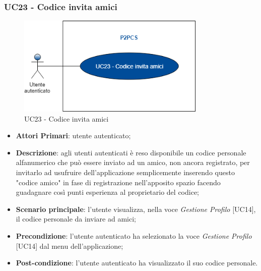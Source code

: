 \subsubsection{UC23 - Codice invita amici}
\begin{figure}[h]
	\includegraphics[width=9cm]{res/images/UC23Codiceamico.png}
	\centering
	\caption{UC23 - Codice invita amici}
\end{figure}
\begin{itemize}
	\item \textbf{Attori Primari}: utente autenticato;
	\item \textbf{Descrizione}: agli utenti autenticati è reso disponibile un codice personale alfanumerico che può essere inviato ad un amico, non ancora registrato, per invitarlo ad usufruire dell'applicazione semplicemente inserendo questo "codice amico" in fase di registrazione nell'apposito spazio facendo guadagnare così punti esperienza al proprietario del codice;
	\item \textbf{Scenario principale}: l'utente visualizza, nella voce \textit{Gestione Profilo} [UC14], il codice personale da inviare ad amici;
	\item \textbf{Precondizione}: l'utente autenticato ha selezionato la voce \textit{Gestione Profilo} [UC14] dal menu dell'applicazione;
	\item \textbf{Post-condizione}: l'utente autenticato ha visualizzato il suo codice personale. 
\end{itemize} 
